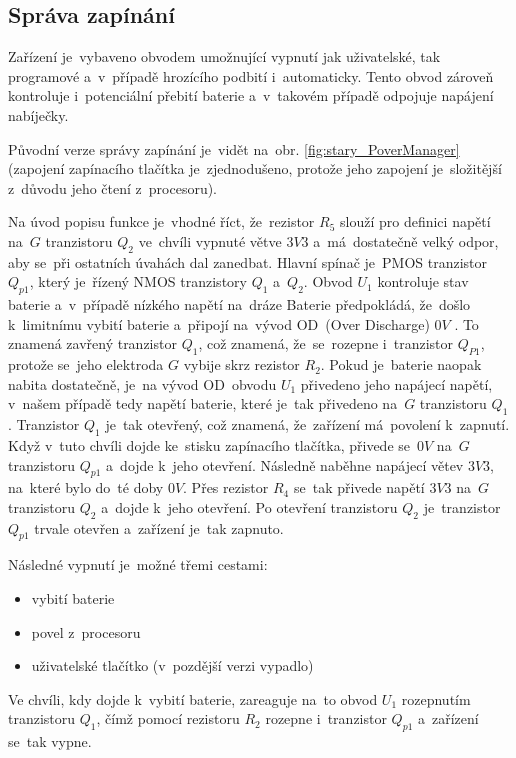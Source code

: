 \subsection{Správa zapínání}
Zařízení je~vybaveno obvodem umožnující vypnutí jak uživatelské, tak programové a~v~případě hrozícího podbití i~automaticky.
Tento obvod zároveň kontroluje i~potenciální přebití baterie a~v~takovém případě odpojuje napájení nabíječky.

Původní verze správy zapínání je~vidět na~obr. \ref{fig:stary_PoverManager} (zapojení zapínacího tlačítka je~zjednodušeno, protože jeho zapojení je~složitější z~důvodu jeho čtení z~procesoru).

Na úvod popisu funkce je~vhodné říct, že~rezistor \(R_{5}\) slouží pro definici napětí na~\(G\) tranzistoru \(Q_{2}\) ve~chvíli vypnuté větve \(3V3\) a~má~dostatečně velký odpor, aby se~při ostatních úvahách dal zanedbat.
Hlavní spínač je~PMOS tranzistor \(Q_{p1}\), který je~řízený NMOS tranzistory \(Q_{1}\) a~\(Q_{2}\).
Obvod \(U_{1}\) kontroluje stav baterie a~v~případě nízkého napětí na~dráze Baterie předpokládá, že~došlo k~limitnímu vybití baterie a~připojí na~vývod OD~(Over Discharge) \(0 V\) \cite{SL8261}.
To znamená zavřený tranzistor \(Q_{1}\), což znamená, že~se~rozepne i~tranzistor \(Q_{P1}\), protože se~jeho elektroda \(G\) vybije skrz rezistor \(R_{2}\).
Pokud je~baterie naopak nabita dostatečně, je~na vývod OD~obvodu \(U_{1}\) přivedeno jeho napájecí napětí\cite{SL8261}, v~našem případě tedy napětí baterie, které je~tak přivedeno na~\(G\) tranzistoru \(Q_{1}\).
Tranzistor \(Q_{1}\) je~tak otevřený, což znamená, že~zařízení má~povolení k~zapnutí. 
Když v~tuto chvíli dojde ke~stisku zapínacího tlačítka, přivede se~\(0 V\) na~\(G\) tranzistoru \(Q_{p1}\) a~dojde k~jeho otevření.
Následně naběhne napájecí větev \(3V3\), na~které bylo do~té doby \(0 V\).
Přes rezistor \(R_{4}\) se~tak přivede napětí \(3V3\) na~\(G\) tranzistoru \(Q_{2}\) a~dojde k~jeho otevření.
Po otevření tranzistoru \(Q_{2}\) je~tranzistor \(Q_{p1}\) trvale otevřen a~zařízení je~tak zapnuto.

Následné vypnutí je~možné třemi cestami:
\begin{itemize}
    \item vybití baterie
    \item povel z~procesoru
    \item uživatelské tlačítko (v~pozdější verzi vypadlo)
\end{itemize}

Ve chvíli, kdy dojde k~vybití baterie, zareaguje na~to obvod \(U_{1}\) rozepnutím tranzistoru \(Q_{1}\), čímž pomocí rezistoru \(R_{2}\) rozepne i~tranzistor \(Q_{p1}\) a~zařízení se~tak vypne.

